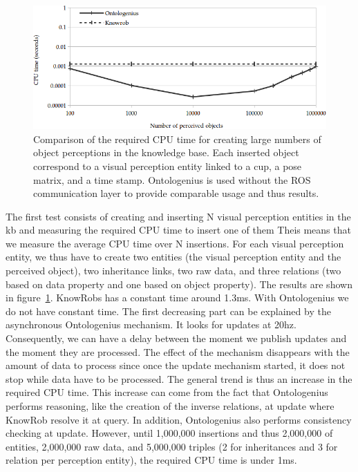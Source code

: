 \begin{figure}[ht!]
\centering
\includegraphics[width=\textwidth]{figures/chapter2/knowrob/Insertion.png}
\caption{\label{fig:chap2_knowrob_insertion} Comparison of the required CPU time for creating large numbers of object perceptions in the knowledge base. Each inserted object correspond to a visual perception entity linked to a cup, a pose matrix, and a time stamp. Ontologenius is used without the ROS communication layer to provide comparable usage and thus results.}
\end{figure}

The first test consists of creating and inserting N visual perception entities in the \acrshort{kb} and measuring the required CPU time to insert one of them Theis means that we measure the average CPU time over N insertions. For each visual perception entity, we thus have to create two entities (the visual perception entity and the perceived object), two inheritance links, two raw data, and three relations (two based on data property and one based on object property). The results are shown in figure~\ref{fig:chap2_knowrob_insertion}. KnowRobs has a constant time around 1.3ms. With Ontologenius we do not have constant time. The first decreasing part can be explained by the asynchronous Ontologenius mechanism. It looks for updates at 20hz. Consequently, we can have a delay between the moment we publish updates and the moment they are processed. The effect of the mechanism disappears with the amount of data to process since once the update mechanism started, it does not stop while data have to be processed. The general trend is thus an increase in the required CPU time. This increase can come from the fact that Ontologenius performs reasoning, like the creation of the inverse relations, at update where KnowRob resolve it at query. In addition, Ontologenius also performs consistency checking at update. However, until 1,000,000 insertions and thus 2,000,000 of entities, 2,000,000 raw data, and 5,000,000 triples (2 for inheritances and 3 for relation per perception entity), the required CPU time is under 1ms.

